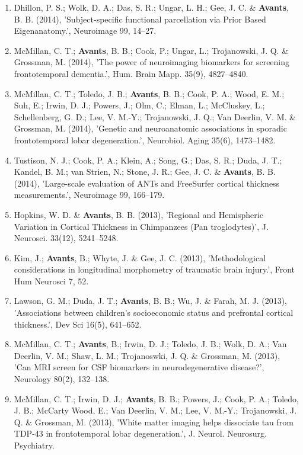 \documentclass[11pt]{moderncv} %
\begin{document}
\begin{enumerate}
\item  Dhillon, P. S.; Wolk, D. A.; Das, S. R.; Ungar, L. H.; Gee, J. C. \&  \textbf{Avants}, B. B. (2014), 'Subject-specific functional parcellation via Prior Based Eigenanatomy.', Neuroimage 99, 14--27.

\item  McMillan, C. T.; \textbf{Avants}, B. B.; Cook, P.; Ungar, L.; Trojanowski, J. Q. \&  Grossman, M. (2014), 'The power of neuroimaging biomarkers for screening frontotemporal dementia.', Hum. Brain Mapp. 35(9), 4827--4840.

\item  McMillan, C. T.; Toledo, J. B.; \textbf{Avants}, B. B.; Cook, P. A.; Wood, E. M.; Suh, E.; Irwin, D. J.; Powers, J.; Olm, C.; Elman, L.; McCluskey, L.; Schellenberg, G. D.; Lee, V. M.-Y.; Trojanowski, J. Q.; Van Deerlin, V. M. \&  Grossman, M. (2014), 'Genetic and neuroanatomic associations in sporadic frontotemporal lobar degeneration.', Neurobiol. Aging 35(6), 1473--1482.

\item  Tustison, N. J.; Cook, P. A.; Klein, A.; Song, G.; Das, S. R.; Duda, J. T.; Kandel, B. M.; van Strien, N.; Stone, J. R.; Gee, J. C. \&  \textbf{Avants}, B. B. (2014), 'Large-scale evaluation of ANTs and FreeSurfer cortical thickness measurements.', Neuroimage 99, 166--179.

\item  Hopkins, W. D. \&  \textbf{Avants}, B. B. (2013), 'Regional and Hemispheric Variation in Cortical Thickness in Chimpanzees (Pan troglodytes)', J. Neurosci. 33(12), 5241--5248.

\item  Kim, J.; \textbf{Avants}, B.; Whyte, J. \&  Gee, J. C. (2013), 'Methodological considerations in longitudinal morphometry of traumatic brain injury.', Front Hum Neurosci 7, 52.

\item  Lawson, G. M.; Duda, J. T.; \textbf{Avants}, B. B.; Wu, J. \&  Farah, M. J. (2013), 'Associations between children's socioeconomic status and prefrontal cortical thickness.', Dev Sci 16(5), 641--652.

\item  McMillan, C. T.; \textbf{Avants}, B.; Irwin, D. J.; Toledo, J. B.; Wolk, D. A.; Van Deerlin, V. M.; Shaw, L. M.; Trojanoswki, J. Q. \&  Grossman, M. (2013), 'Can MRI screen for CSF biomarkers in neurodegenerative disease?', Neurology 80(2), 132--138.

\item  McMillan, C. T.; Irwin, D. J.; \textbf{Avants}, B. B.; Powers, J.; Cook, P. A.; Toledo, J. B.; McCarty Wood, E.; Van Deerlin, V. M.; Lee, V. M.-Y.; Trojanowski, J. Q. \&  Grossman, M. (2013), 'White matter imaging helps dissociate tau from TDP-43 in frontotemporal lobar degeneration.', J. Neurol. Neurosurg. Psychiatry.


\end{enumerate}
\end{document}
